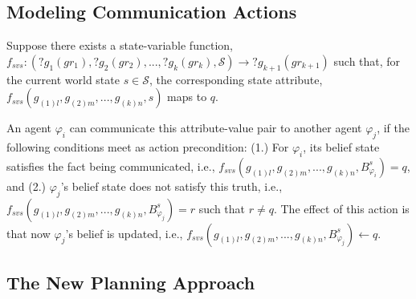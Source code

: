 \documentclass[letterpaper]{article} %
\begin{document}
\subsection{Modeling Communication Actions} 
% 
Suppose there exists a state-variable function, $f_{svs}:(?g_1 (gr_1), ?g_2 (gr_2), ..., ?g_k (gr_k),\mathcal{S}) \rightarrow ?g_{k+1} (gr_{k+1})$ such that,
for the current world state $s \in \mathcal{S}$, the corresponding state attribute, $f_{\textit{svs}}(g_{(1)l},g_{(2)m},...,g_{(k)n},s)$ maps to $q$.

An agent $\varphi_i$ can communicate this attribute-value pair to another agent $\varphi_j$, if the following conditions meet as action precondition: 
(1.) For $\varphi_i$, its belief state satisfies the fact being communicated, i.e.,
$f_{\textit{svs}}(g_{(1)l},g_{(2)m},...,g_{(k)n},B_{\varphi_i}^s) = q$, and (2.) $\varphi_j$'s belief state does not satisfy this truth, i.e., $f_{\textit{svs}}(g_{(1)l},g_{(2)m},...,g_{(k)n},B_{\varphi_j}^s) = r$ such that $r \neq q$.
The effect of this action is that now 
$\varphi_j$'s belief is updated, i.e., $f_{\textit{svs}}(g_{(1)l},g_{(2)m},...,g_{(k)n},B_{\varphi_j}^s) \leftarrow q$. 

% 



\subsection{The New Planning Approach}
\end{document}
